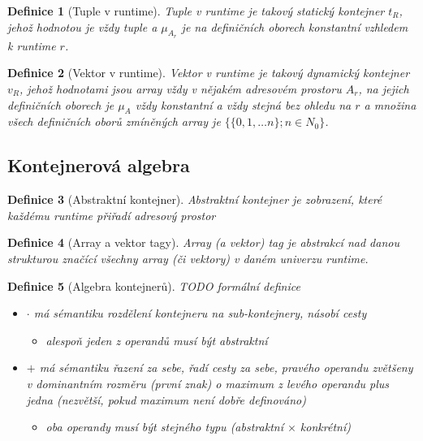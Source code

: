\documentclass[a4paper,12pt]{article}
\newtheorem{definition}{Definice}[section]
\begin{document}
\begin{definition}[Tuple v runtime]
    Tuple v runtime je takový statický kontejner $t_R$, jehož hodnotou je vždy tuple a $\mu_{A_r}$ je na definičních oborech konstantní vzhledem k runtime $r$.
\end{definition}

\begin{definition}[Vektor v runtime]
    Vektor v runtime je takový dynamický kontejner $v_R$, jehož hodnotami jsou array vždy v nějakém adresovém prostoru $A_r$, na jejich definičních oborech je $\mu_A$ vždy konstantní a vždy stejná bez ohledu na $r$ a množina všech definičních oborů zmíněných array je $\{\{0,1,\dots n\}; n \in N_0\}$.
\end{definition}

\subsection{Kontejnerová algebra}

\begin{definition}[Abstraktní kontejner]
    Abstraktní kontejner je zobrazení, které každému runtime přiřadí adresový prostor
\end{definition}

\begin{definition}[Array a vektor tagy]
    Array (a vektor) tag je abstrakcí nad danou strukturou značící všechny array (či vektory) v daném univerzu runtime.
\end{definition}

\begin{definition}[Algebra kontejnerů]
    TODO formální definice

    \begin{itemize}
        \item $\cdot$ má sémantiku rozdělení kontejneru na sub-kontejnery, násobí cesty
        \begin{itemize}
            \item alespoň jeden z operandů musí být abstraktní
        \end{itemize}
        \item $+$ má sémantiku řazení za sebe, řadí cesty za sebe, pravého operandu zvětšeny v dominantním rozměru (první znak) o maximum z levého operandu plus jedna (nezvětší, pokud maximum není dobře definováno)
        \begin{itemize}
            \item oba operandy musí být stejného typu (abstraktní $\times$ konkrétní)
        \end{itemize}
    \end{itemize}
\end{definition}
\end{document}
